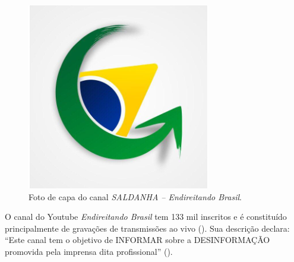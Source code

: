\documentclass[portuguese]{textolivre}
\begin{document}
\begin{figure}[h!]
\begin{minipage}[t]{0.38\textwidth}
\includegraphics[width=\linewidth]{Imagens/Fig10.png}
\caption{Foto de capa do canal \emph{SALDANHA -- Endireitando Brasil}.}
\label{fig-10}
\end{minipage}
\end{figure}

O canal do Youtube \emph{Endireitando Brasil} tem 133 mil inscritos e é constituído principalmente de gravações de transmissões ao vivo (). Sua descrição declara: ``Este canal tem o objetivo de INFORMAR sobre a DESINFORMAÇÃO promovida pela imprensa dita profissional'' ().
\end{document}
